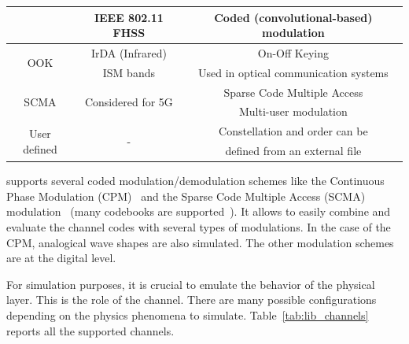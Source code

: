 \begin{table}
\begin{tabular}{ c | c | c }
                                         & IEEE 802.11 FHSS                   & Coded (convolutional-based) modulation    \\
  \hline
  \multirow{2}{*}{{OOK}}                 & IrDA (Infrared)                    & On-Off Keying                             \\
                                         & ISM bands                          & Used in optical communication systems     \\
  \hline
  \multirow{2}{*}{{SCMA}}                & \multirow{2}{*}{Considered for 5G} & Sparse Code Multiple Access               \\
                                         &                                    & Multi-user modulation                     \\
  \hline
  \multirow{2}{*}{{User defined}}        & \multirow{2}{*}{-}                 & Constellation and order can be            \\
                                         &                                    & defined from an external file             \\
  \end{tabular}
\end{table}

\AFFECT supports several coded modulation/demodulation schemes like the
Continuous Phase Modulation (CPM)~\cite{Aulin1981a,Aulin1981b} and the Sparse
Code Multiple Access (SCMA) modulation~\cite{Nikopour2013,Ghaffari2017,
Ghaffari2019} (many codebooks are supported~\cite{AlteraSCMA,Wu2015,Cheng2015,
Zhang2016,Klimentyev2016,Song2017,Klimentyev2017}). It allows to easily combine
and evaluate the channel codes with several types of modulations. In the case of
the CPM, analogical wave shapes are also simulated. The other modulation schemes
are at the digital level.

For simulation purposes, it is crucial to emulate the behavior of the physical
layer. This is the role of the channel. There are many possible configurations
depending on the physics phenomena to simulate.
Table~\ref{tab:lib_channels} reports all the supported channels.

